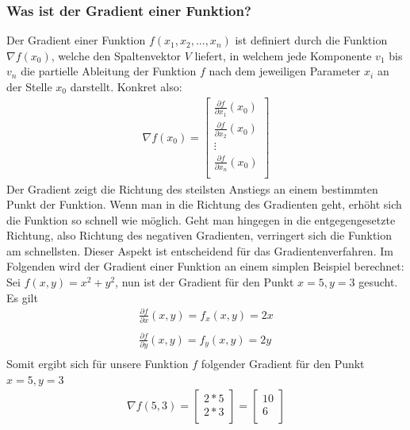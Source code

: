 \subsubsection{Was ist der Gradient einer Funktion?}\label{subsec:gradientenverfahren:was_ist_gradient}
  Der Gradient einer Funktion $f(x_{1}, x_{2}, ... , x_{n})$ ist definiert durch die Funktion $\nabla f(x_{0})$, welche den Spaltenvektor $V$ liefert, in welchem jede Komponente $v_1$ bis $v_n$ die partielle Ableitung der Funktion $f$ nach dem jeweiligen Parameter 
  $x_{i}$ an der Stelle $x_0$ darstellt. Konkret also: 
  \renewcommand{\arraystretch}{1.5}
  \begin{align*}
    \nabla f(x_0) =\begin{bmatrix}
          \frac{\partial f}{\partial x_{1}}(x_{0}) \\
          \frac{\partial f}{\partial x_{2}}(x_{0}) \\
           \vdots \\
           \frac{\partial f}{\partial x_{n}}(x_{0}) \\
         \end{bmatrix}
  \end{align*}
  \renewcommand{\arraystretch}{1}
  Der Gradient zeigt die Richtung des steilsten Anstiegs an einem bestimmten Punkt der Funktion. 
  Wenn man in die Richtung des Gradienten geht, erhöht sich die Funktion so schnell wie möglich. 
  Geht man hingegen in die entgegengesetzte Richtung, also Richtung des negativen Gradienten, verringert sich die Funktion am schnellsten.
  Dieser Aspekt ist entscheidend für das Gradientenverfahren.
  \bigbreak\noindent
  Im Folgenden wird der Gradient einer Funktion an einem simplen Beispiel berechnet: 
  \bigbreak\noindent
  Sei $f(x, y) = x^2 + y^2$, nun ist der Gradient für den Punkt $x = 5, y = 3$ gesucht. Es gilt
  \begin{align*}
    \frac{\partial f}{\partial x}(x,y) = f_{x}(x,y) = 2x\\
    \\
    \frac{\partial f}{\partial y}(x,y) = f_{y}(x,y) = 2y\\
  \end{align*}
  Somit ergibt sich für unsere Funktion $f$ folgender Gradient für den Punkt $x = 5, y = 3$ 
  \begin{align*}
    \nabla f(5, 3) = \begin{bmatrix}
      2 * 5\\
      2 * 3\\
    \end{bmatrix} = \begin{bmatrix}
      10\\
      6\\
    \end{bmatrix}
  \end{align*}

